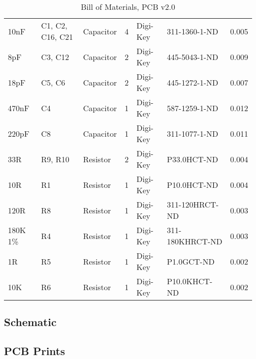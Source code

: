 \begin{sidewaystable}[h!]
\begin{tabularx}{1\textwidth}{l X l l l l l}
        10nF             & C1, C2, C16, C21       & Capacitor   & 4   & Digi-Key & 311-1360-1-ND          & 0.005             \\ 
        8pF              & C3, C12                & Capacitor   & 2   & Digi-Key & 445-5043-1-ND          & 0.009             \\ 
        18pF             & C5, C6                 & Capacitor   & 2   & Digi-Key & 445-1272-1-ND          & 0.007             \\ 
        470nF            & C4                     & Capacitor   & 1   & Digi-Key & 587-1259-1-ND          & 0.012             \\ 
        220pF            & C8                     & Capacitor   & 1   & Digi-Key & 311-1077-1-ND          & 0.011             \\ 
        33R              & R9, R10                & Resistor    & 2   & Digi-Key & P33.0HCT-ND            & 0.004             \\ 
        10R              & R1                     & Resistor    & 1   & Digi-Key & P10.0HCT-ND            & 0.004             \\ 
        120R             & R8                     & Resistor    & 1   & Digi-Key & 311-120HRCT-ND         & 0.003             \\ 
        180K 1\%         & R4                     & Resistor    & 1   & Digi-Key & 311-180KHRCT-ND        & 0.003             \\ 
        1R               & R5                     & Resistor    & 1   & Digi-Key & P1.0GCT-ND             & 0.002             \\ 
        10K              & R6                     & Resistor    & 1   & Digi-Key & P10.0KHCT-ND           & 0.002             \\
        \bottomrule
     \end{tabularx}
     \caption{Bill of Materials, PCB v2.0}
     \label{tab:bom-v2}
   \end{sidewaystable}

\bigskip
\subsection{Schematic}\label{sub:schem-v2}



\subsection{PCB Prints}\label{sub:prints-v2}





